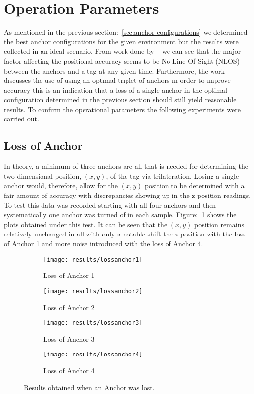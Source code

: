 \section{Operation Parameters}\label{sec:op-params}
As mentioned in the previous section:~\ref{sec:anchor-configurations} we determined the best anchor configurations for the given environment but the results were collected in an ideal scenario.
From work done by ~\citet{evaluwb} we can see that the major factor affecting the positional accuracy seems to be No Line Of Sight (NLOS) between the anchors and a tag at any given time.
Furthermore, the work discusses the use of using an optimal triplet of anchors in order to improve accuracy this is an indication that a loss of a single anchor in the optimal configuration determined in the previous section should still yield reasonable results.
To confirm the operational parameters the following experiments were carried out.

\subsection{Loss of Anchor}\label{subsec:loss-of-anchor}
In theory, a minimum of three anchors are all that is needed for determining the two-dimensional position, $(x,y)$, of the tag via trilateration.
Losing a single anchor would, therefore, allow for the $(x,y)$ position to be determined with a fair amount of accuracy with discrepancies showing up in the z position readings.
To test this data was recorded starting with all four anchors and then systematically one anchor was turned of in each sample.
Figure:~\ref{fig:Loss_anchors} shows the plots obtained under this test.
It can be seen that the $(x,y)$ position remains relatively unchanged in all with only a notable shift the z position with the loss of Anchor 1 and more noise introduced with the loss of Anchor 4.

\begin{figure}[h!]
    \centering
    \begin{subfigure}{0.45\textwidth}
            \texttt{[image: results/lossanchor1]}
            \caption{Loss of Anchor 1}
    \end{subfigure}
    \begin{subfigure}{0.45\textwidth}
            \texttt{[image: results/lossanchor2]}
            \caption{Loss of Anchor 2}
    \end{subfigure}

    \begin{subfigure}{0.45\textwidth}
            \texttt{[image: results/lossanchor3]}
            \caption{Loss of Anchor 3}
    \end{subfigure}
    \begin{subfigure}{0.45\textwidth}
            \texttt{[image: results/lossanchor4]}
            \caption{Loss of Anchor 4}
    \end{subfigure}
    \caption{Results obtained when an Anchor was lost.}
    \label{fig:Loss_anchors}
\end{figure}
\newpage
